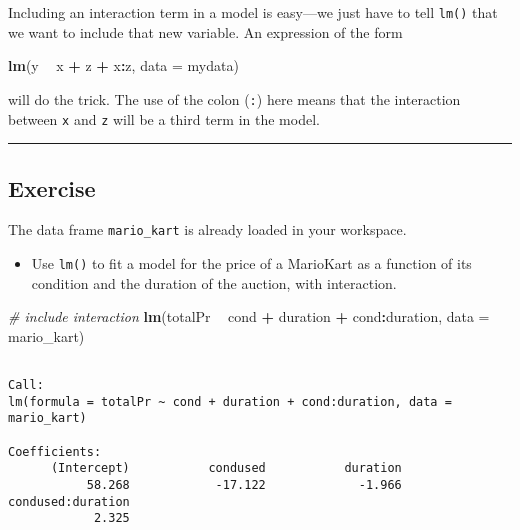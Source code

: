 \documentclass[]{book}
\newenvironment{Shaded}{\begin{snugshade}}{\end{snugshade}}
\newcommand{\KeywordTok}[1]{\textcolor[rgb]{0.13,0.29,0.53}{\textbf{#1}}}
\newcommand{\DataTypeTok}[1]{\textcolor[rgb]{0.13,0.29,0.53}{#1}}
\newcommand{\StringTok}[1]{\textcolor[rgb]{0.31,0.60,0.02}{#1}}
\newcommand{\CommentTok}[1]{\textcolor[rgb]{0.56,0.35,0.01}{\textit{#1}}}
\newcommand{\OperatorTok}[1]{\textcolor[rgb]{0.81,0.36,0.00}{\textbf{#1}}}
\newcommand{\NormalTok}[1]{#1}
\providecommand{\tightlist}{%
  \setlength{\itemsep}{0pt}\setlength{\parskip}{0pt}}
\begin{document}
Including an interaction term in a model is easy---we just have to tell
\texttt{lm()} that we want to include that new variable. An expression
of the form

\begin{Shaded}
\begin{Highlighting}[]
\KeywordTok{lm}\NormalTok{(y }\OperatorTok{~}\StringTok{ }\NormalTok{x }\OperatorTok{+}\StringTok{ }\NormalTok{z }\OperatorTok{+}\StringTok{ }\NormalTok{x}\OperatorTok{:}\NormalTok{z, }\DataTypeTok{data =}\NormalTok{ mydata)}
\end{Highlighting}
\end{Shaded}

will do the trick. The use of the colon (\texttt{:}) here means that the
interaction between \texttt{x} and \texttt{z} will be a third term in
the model.

\begin{center}\rule{0.5\linewidth}{\linethickness}\end{center}

\subsection*{Exercise}\label{exercise-6}

The data frame \texttt{mario\_kart} is already loaded in your workspace.

\begin{itemize}
\tightlist
\item
  Use \texttt{lm()} to fit a model for the price of a MarioKart as a
  function of its condition and the duration of the auction, with
  interaction.
\end{itemize}

\begin{Shaded}
\begin{Highlighting}[]
\CommentTok{# include interaction}
\KeywordTok{lm}\NormalTok{(totalPr }\OperatorTok{~}\StringTok{ }\NormalTok{cond }\OperatorTok{+}\StringTok{ }\NormalTok{duration }\OperatorTok{+}\StringTok{ }\NormalTok{cond}\OperatorTok{:}\NormalTok{duration, }\DataTypeTok{data =}\NormalTok{ mario_kart)}
\end{Highlighting}
\end{Shaded}

\begin{verbatim}

Call:
lm(formula = totalPr ~ cond + duration + cond:duration, data = mario_kart)

Coefficients:
      (Intercept)           condused           duration  
           58.268            -17.122             -1.966  
condused:duration  
            2.325  
\end{verbatim}
\end{document}
